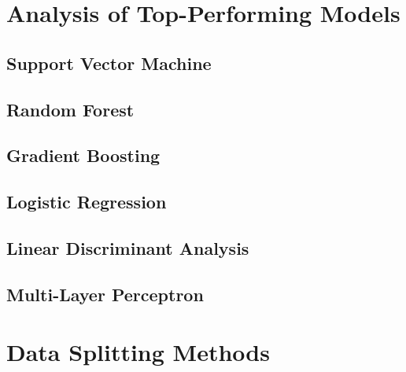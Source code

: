     \section{Analysis of Top-Performing Models}
        \subsection{Support Vector Machine}
        \subsection{Random Forest}
        \subsection{Gradient Boosting}
        \subsection{Logistic Regression}
        \subsection{Linear Discriminant Analysis}
        \subsection{Multi-Layer Perceptron}

    \section{Data Splitting Methods}

    
                
